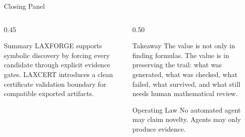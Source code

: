 \documentclass[aspectratio=169,11pt]{beamer}
\begin{document}
\begin{frame}{Closing Panel}
  \begin{columns}[T,totalwidth=\textwidth]
    \begin{column}{0.45\textwidth}
      \begin{block}{Summary}
        LAXFORGE supports symbolic discovery by forcing every candidate through
        explicit evidence gates. LAXCERT introduces a clean certificate
        validation boundary for compatible exported artifacts.
      \end{block}
    \end{column}
    \begin{column}{0.50\textwidth}
      \begin{block}{Takeaway}
        The value is not only in finding formulas. The value is in preserving
        the trail: what was generated, what was checked, what failed, what
        survived, and what still needs human mathematical review.
      \end{block}
      \begin{alertblock}{Operating Law}
        No automated agent may claim novelty. Agents may only produce evidence.
      \end{alertblock}
    \end{column}
  \end{columns}
\end{frame}
\end{document}
